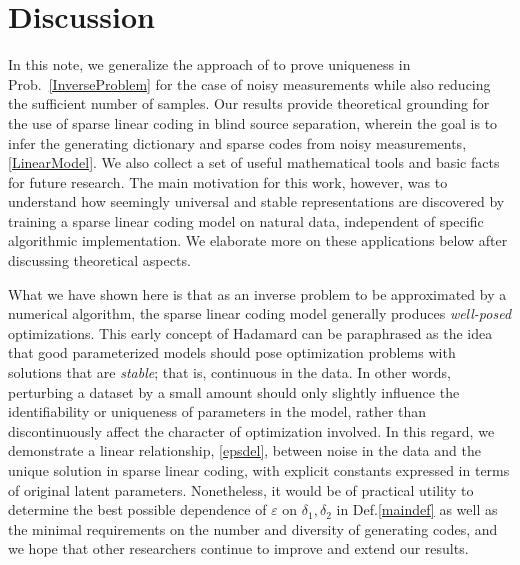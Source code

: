\documentclass[9pt,twocolumn]{pnas-new}
\begin{document}
 
\section{Discussion}\label{Discussion}


In this note, we generalize the approach of \cite{Hillar15} to prove uniqueness in Prob.~\ref{InverseProblem} for the case of noisy measurements while also reducing the sufficient number of samples.
Our results provide theoretical grounding for the use of sparse linear coding in blind source separation, wherein the goal is to infer the generating dictionary and sparse codes from noisy measurements, \eqref{LinearModel}.  We also collect a set of useful mathematical tools and basic facts for future research.
The main motivation for this work, however, was to understand how seemingly universal and stable representations are discovered by training a sparse linear coding model on natural data, independent of specific algorithmic implementation.    We elaborate more on these applications below after discussing  theoretical aspects.  %


What we have shown here is that as an inverse problem to be approximated by a numerical algorithm, the sparse linear coding model  generally produces \textit{well-posed} optimizations.  This early concept of Hadamard \cite{Hadamard1902} can be paraphrased as the idea that good parameterized models should pose optimization problems with solutions that are \textit{stable}; that is, continuous in the data.  In other words, perturbing a dataset by a small amount should only slightly influence the identifiability or uniqueness of parameters in the model, rather than discontinuously affect the character of optimization involved.  In this regard, we demonstrate a linear relationship, \eqref{epsdel}, between noise in the data and the unique solution in  sparse linear coding, with explicit constants expressed in terms of original latent parameters. 
Nonetheless, it would be of practical utility to determine the best possible dependence of $\varepsilon$ on $\delta_1, \delta_2$ in Def.\ref{maindef} as well as the minimal requirements on the number and diversity of generating codes, and we hope that other researchers continue to improve and extend our results.
\end{document}
